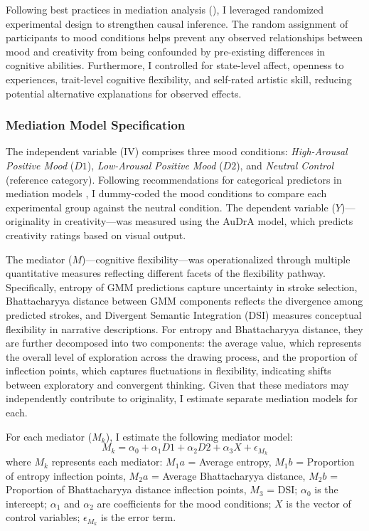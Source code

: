 \documentclass[../MA_Thesis.tex]{subfiles}
\begin{document}
Following best practices in mediation analysis (\cite{homburg_mediation_2022}), I leveraged randomized experimental design to strengthen causal inference. The random assignment of participants to mood conditions helps prevent any observed relationships between mood and creativity from being confounded by pre-existing differences in cognitive abilities. Furthermore, I controlled for state-level affect, openness to experiences, trait-level cognitive flexibility, and self-rated artistic skill, reducing potential alternative explanations for observed effects.

\subsubsection*{Mediation Model Specification}
The independent variable (IV) comprises three mood conditions: \textit{High-Arousal Positive Mood} (\(D1\)), \textit{Low-Arousal Positive Mood} (\(D2\)), and \textit{Neutral Control} (reference category). Following recommendations for categorical predictors in mediation models \cite{hayes_statistical_2014}, I dummy-coded the mood conditions to compare each experimental group against the neutral condition. The dependent variable (\(Y\))—originality in creativity—was measured using the AuDrA model, which predicts creativity ratings based on visual output.

The mediator (\(M\))—cognitive flexibility—was operationalized through multiple quantitative measures reflecting different facets of the flexibility pathway. Specifically, entropy of GMM predictions capture uncertainty in stroke selection, Bhattacharyya distance between GMM components reflects the divergence among predicted strokes, and Divergent Semantic Integration (DSI) measures conceptual flexibility in narrative descriptions. For entropy and Bhattacharyya distance, they are further decomposed into two components: the average value, which represents the overall level of exploration across the drawing process, and the proportion of inflection points, which captures fluctuations in flexibility, indicating shifts between exploratory and convergent thinking. Given that these mediators may independently contribute to originality, I estimate separate mediation models for each.

For each mediator (\(M_k\)), I estimate the following mediator model:
\begin{equation*}
    M_k = \alpha_0 + \alpha_1 D1 + \alpha_2 D2 + \alpha_3 X + \epsilon_{M_k}
\end{equation*}
where \( M_k \) represents each mediator: \( M_1a \) = Average entropy, \( M_1b \) = Proportion of entropy inflection points, \( M_2a \) = Average Bhattacharyya distance, \( M_2b \) = Proportion of Bhattacharyya distance inflection points, \( M_3 \) = DSI; \( \alpha_0 \) is the intercept; \( \alpha_1 \) and \( \alpha_2 \) are coefficients for the mood conditions; \( X \) is the vector of control variables; \( \epsilon_{M_k} \) is the error term.
\end{document}
